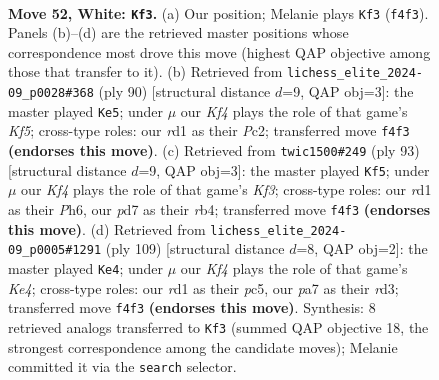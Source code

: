 \documentclass[11pt]{article}
\begin{document}
\clearpage

\begin{figure}[p]\centering
\begin{subfigure}{0.46\textwidth}\centering
\resizebox{\linewidth}{!}{%
\newchessgame
\chessboard[
  setfen={8/p2p2k1/2p5/5P2/5K2/8/8/3r4 w - - 5 52},
  showmover=false,
  pgfstyle=straightmove, color=movearrow, markmove={f4-f3}
]}
\caption{}
\end{subfigure}\hfill
\begin{subfigure}{0.46\textwidth}\centering
\resizebox{\linewidth}{!}{%
\newchessgame
\chessboard[
  setfen={8/6k1/8/2p2KP1/1p6/8/2P5/8 w - - 0 46},
  showmover=false,
  pgfstyle=straightmove, color=movearrow, markmove={f5-e5}
]}
\caption{}
\end{subfigure}
\\[4pt]
\begin{subfigure}{0.46\textwidth}\centering
\resizebox{\linewidth}{!}{%
\newchessgame
\chessboard[
  setfen={8/8/4pk1p/8/PR5P/4K3/8/3r4 b - - 2 47},
  showmover=false,
  pgfstyle=straightmove, color=movearrow, markmove={f6-f5}
]}
\caption{}
\end{subfigure}\hfill
\begin{subfigure}{0.46\textwidth}\centering
\resizebox{\linewidth}{!}{%
\newchessgame
\chessboard[
  setfen={8/2K5/8/2P1kp2/8/3R2P1/1r6/8 b - - 3 55},
  showmover=false,
  pgfstyle=straightmove, color=movearrow, markmove={e5-e4}
]}
\caption{}
\end{subfigure}
\caption{\textbf{Move 52, White: \texttt{Kf3}.} (a) Our position; Melanie plays \texttt{Kf3} (\texttt{f4f3}). Panels (b)--(d) are the retrieved master positions whose correspondence most drove this move (highest QAP objective among those that transfer to it). (b) Retrieved from \texttt{lichess\_elite\_2024-09\_p0028\#368} (ply 90) [structural distance $d$=9, QAP obj=3]: the master played \texttt{Ke5}; under $\mu$ our \emph{Kf4} plays the role of that game's \emph{Kf5}; cross-type roles: our \emph{r}d1 as their \emph{P}c2; transferred move \texttt{f4f3} \textbf{(endorses this move)}. (c) Retrieved from \texttt{twic1500\#249} (ply 93) [structural distance $d$=9, QAP obj=3]: the master played \texttt{Kf5}; under $\mu$ our \emph{Kf4} plays the role of that game's \emph{Kf3}; cross-type roles: our \emph{r}d1 as their \emph{P}h6, our \emph{p}d7 as their \emph{r}b4; transferred move \texttt{f4f3} \textbf{(endorses this move)}. (d) Retrieved from \texttt{lichess\_elite\_2024-09\_p0005\#1291} (ply 109) [structural distance $d$=8, QAP obj=2]: the master played \texttt{Ke4}; under $\mu$ our \emph{Kf4} plays the role of that game's \emph{Ke4}; cross-type roles: our \emph{r}d1 as their \emph{p}c5, our \emph{p}a7 as their \emph{r}d3; transferred move \texttt{f4f3} \textbf{(endorses this move)}. Synthesis: 8 retrieved analogs transferred to \texttt{Kf3} (summed QAP objective 18, the strongest correspondence among the candidate moves); Melanie committed it via the \texttt{search} selector.}
\label{fig:thought-m102}
\end{figure}
\end{document}
